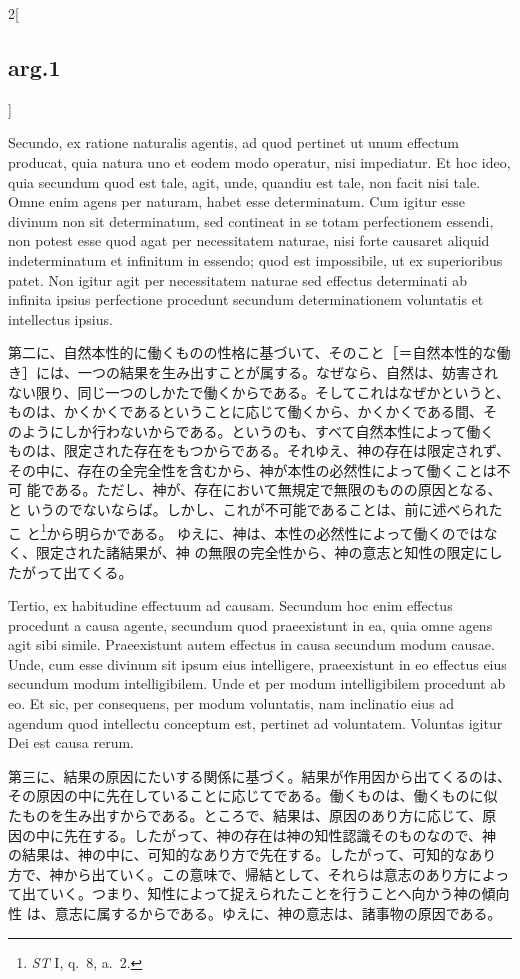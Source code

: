 \documentclass[paper=a4paper,fontsize=10pt,jafontsize=9pt,titlepage]{jlreq}
\begin{document}
\begin{paracol}{2}[\subsection{arg.1}]
\switchcolumn*


Secundo, ex ratione naturalis
 agentis, ad quod pertinet ut unum effectum producat, quia natura uno et
 eodem modo operatur, nisi impediatur. Et hoc ideo, quia secundum quod
 est tale, agit, unde, quandiu est tale, non facit nisi tale. Omne enim
 agens per naturam, habet esse determinatum. Cum igitur esse divinum non
 sit determinatum, sed contineat in se totam perfectionem essendi, non
 potest esse quod agat per necessitatem naturae, nisi forte causaret
 aliquid indeterminatum et infinitum in essendo; quod est impossibile,
 ut ex superioribus patet. Non igitur agit per necessitatem naturae sed
 effectus determinati ab infinita ipsius perfectione procedunt secundum
 determinationem voluntatis et intellectus ipsius.

\switchcolumn

第二に、自然本性的に働くものの性格に基づいて、そのこと［＝自然本性的な働
 き］には、一つの結果を生み出すことが属する。なぜなら、自然は、妨害され
 ない限り、同じ一つのしかたで働くからである。そしてこれはなぜかというと、
 ものは、かくかくであるということに応じて働くから、かくかくである間、そ
 のようにしか行わないからである。というのも、すべて自然本性によって働く
 ものは、限定された存在をもつからである。それゆえ、神の存在は限定されず、
 その中に、存在の全完全性を含むから、神が本性の必然性によって働くことは不可
 能である。ただし、神が、存在において無規定で無限のものの原因となる、と
 いうのでないならば。しかし、これが不可能であることは、前に述べられたこ
 と\footnote{{\itshape ST} I, q.~8, a.~2.}から明らかである。
 ゆえに、神は、本性の必然性によって働くのではなく、限定された諸結果が、神
 の無限の完全性から、神の意志と知性の限定にしたがって出てくる。

\switchcolumn*


Tertio, ex habitudine
 effectuum ad causam. Secundum hoc enim effectus procedunt a causa
 agente, secundum quod praeexistunt in ea, quia omne agens agit sibi
 simile. Praeexistunt autem effectus in causa secundum modum
 causae. Unde, cum esse divinum sit ipsum eius intelligere, praeexistunt
 in eo effectus eius secundum modum intelligibilem. Unde et per modum
 intelligibilem procedunt ab eo. Et sic, per consequens, per modum
 voluntatis, nam inclinatio eius ad agendum quod intellectu conceptum
 est, pertinet ad voluntatem. Voluntas igitur Dei est causa rerum.

\switchcolumn

第三に、結果の原因にたいする関係に基づく。結果が作用因から出てくるのは、
 その原因の中に先在していることに応じてである。働くものは、働くものに似
 たものを生み出すからである。ところで、結果は、原因のあり方に応じて、原
 因の中に先在する。したがって、神の存在は神の知性認識そのものなので、神
 の結果は、神の中に、可知的なあり方で先在する。したがって、可知的なあり
 方で、神から出ていく。この意味で、帰結として、それらは意志のあり方によっ
 て出ていく。つまり、知性によって捉えられたことを行うことへ向かう神の傾向性
 は、意志に属するからである。ゆえに、神の意志は、諸事物の原因である。


\end{paracol}
\end{document}
